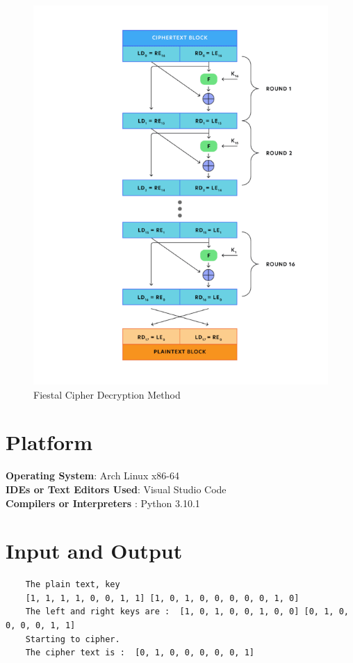\documentclass[openany]{book}
\begin{document}
\begin{figure}[H]
	\centering
	\includegraphics[scale=0.5]{fiestal_cipher.png}
	\caption{Fiestal Cipher Decryption Method}
\end{figure}


\section{Platform}
\textbf{Operating System}: Arch Linux x86-64 \\
\textbf{IDEs or Text Editors Used}: Visual Studio Code\\
\textbf{Compilers or Interpreters} : Python 3.10.1\\

\section{Input and Output}
\begin{verbatim}
    The plain text, key
    [1, 1, 1, 1, 0, 0, 1, 1] [1, 0, 1, 0, 0, 0, 0, 0, 1, 0]
    The left and right keys are :  [1, 0, 1, 0, 0, 1, 0, 0] [0, 1, 0, 0, 0, 0, 1, 1]
    Starting to cipher. 
    The cipher text is :  [0, 1, 0, 0, 0, 0, 0, 1]
\end{verbatim}
\end{document}

